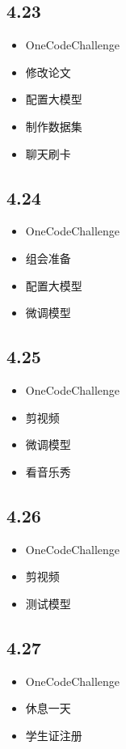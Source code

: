 \documentclass[UTF8]{ctexart}
\begin{document}
\subsection*{4.23}
\begin{itemize}
    \item OneCodeChallenge
    \item 修改论文
    \item 配置大模型
    \item 制作数据集
    \item 聊天刷卡
\end{itemize}

\subsection*{4.24}
\begin{itemize}
    \item OneCodeChallenge
    \item 组会准备
    \item 配置大模型
    \item 微调模型
\end{itemize}

\subsection*{4.25}
\begin{itemize}
    \item OneCodeChallenge
    \item 剪视频
    \item 微调模型
    \item 看音乐秀
\end{itemize}

\subsection*{4.26}
\begin{itemize}
    \item OneCodeChallenge
    \item 剪视频
    \item 测试模型
\end{itemize}

\subsection*{4.27}
\begin{itemize}
    \item OneCodeChallenge
    \item 休息一天
    \item 学生证注册
\end{itemize}
\end{document}
